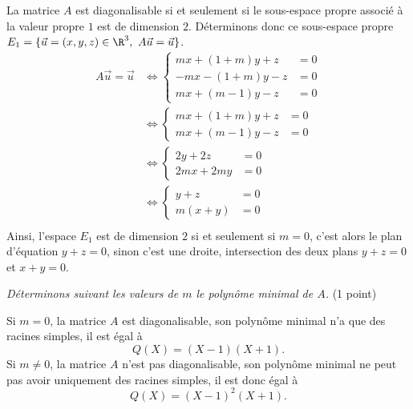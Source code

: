{\begin{enumerate}
{La matrice $A$ est diagonalisable si et seulement si le sous-espace propre associ\'e \`a la valeur propre $1$ est de dimension $2$. D\'eterminons donc ce sous-espace propre $E_1=\{\vec u=(x,y,z)\in\R^3,\ A\vec u=\vec u\}$.
$$\begin{aligned}
A\vec u=\vec u
&\iff\left\{{\begin{aligned}mx+(1+m)y+z&=0 \\  -mx-(1+m)y-z&=0 \\  mx+(m-1)y-z&=0\end{aligned}} \right. \\ 
&\iff\left\{{\begin{aligned}mx+(1+m)y+z&=0 \\  mx+(m-1)y-z&=0\end{aligned}}\right. \\ 
&\iff\left\{{\begin{aligned}2y+2z&=0 \\  2mx+2my&=0\end{aligned}}\right. \\ 
&\iff\left\{{\begin{aligned}y+z&=0 \\  m(x+y)&=0\end{aligned}}\right. \\ 
\end{aligned}$$
Ainsi, l'espace $E_1$ est de dimension $2$ si et seulement si $m=0$, c'est alors le plan d'\'equation $y+z=0$, sinon c'est une droite, intersection des deux plans $y+z=0$ et $x+y=0$.

{\it D\'eterminons suivant les valeurs de $m$ le polyn\^ome minimal de $A$.} (1 point)

Si $m=0$, la matrice $A$ est diagonalisable, son polyn\^ome minimal n'a que des racines simples, il est \'egal \`a 
$$Q(X)=(X-1)(X+1).$$
Si $m\neq 0$, la matrice $A$ n'est pas diagonalisable, son polyn\^ome minimal ne peut pas avoir uniquement des racines simples, il est donc \'egal \`a
$$Q(X)=(X-1)^2(X+1).$$}
\end{enumerate}
}
